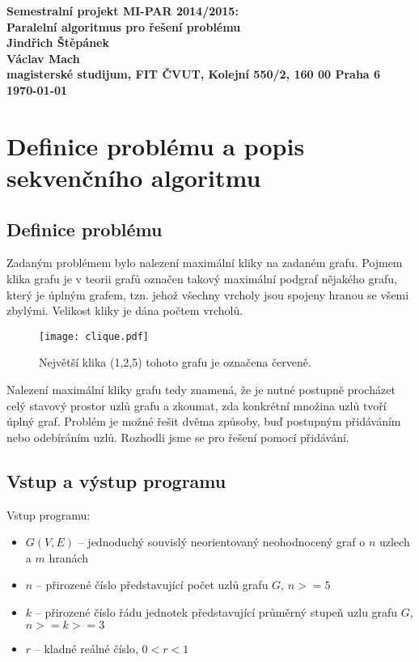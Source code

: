 \documentclass[12pt]{article}
\begin{document}
\begin{center}
  \bf Semestralní projekt MI-PAR 2014/2015:\\[5mm]
      Paralelní algoritmus pro řešení problému\\[5mm]
         Jindřich Štěpánek\\
         Václav Mach\\[2mm]
  magisterské studijum, FIT ČVUT, Kolejní 550/2, 160 00 Praha 6\\[2mm]
  \today
\end{center}

\section{Definice problému a popis sekvenčního algoritmu}

\subsection{Definice problému}

Zadaným problémem bylo nalezení maximální kliky na zadaném grafu.
Pojmem klika grafu je v teorii grafů označen takový maximální podgraf nějakého grafu, 
který je úplným grafem, tzn. jehož všechny vrcholy jsou spojeny hranou se všemi zbylými.
Velikost kliky je dána počtem vrcholů.

\begin{figure}[ht]
  \begin{center}
    \texttt{[image: clique.pdf]}
  \end{center}
  \caption{Největší klika (1,2,5) tohoto grafu je označena červeně.}
\end{figure}

Nalezení maximální kliky grafu tedy znamená, že je nutné postupně procházet celý stavový prostor uzlů grafu
a zkoumat, zda konkrétní množina uzlů tvoří úplný graf. Problém je možné řešit dvěma způsoby, 
buď postupným přidáváním nebo odebíráním uzlů. Rozhodli jsme se pro řešení pomocí přidávání.

\subsection{Vstup a výstup programu}

Vstup programu:
\begin{itemize}
  \item{$G(V,E)$ -- jednoduchý souvislý neorientovaný neohodnocený graf o $n$ uzlech a $m$ hranách}
  \item{$n$ -- přirozené číslo představující počet uzlů grafu $G$, $n >= 5$}
  \item{$k$ -- přirozené číslo řádu jednotek představující průměrný stupeň uzlu grafu $G$, $n >= k >= 3$}
  \item{$r$ -- kladné reálné číslo, $0 < r < 1$}    %
\end{itemize}
\end{document}
